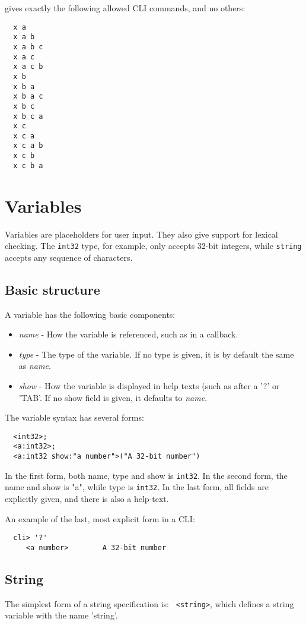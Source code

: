 \documentclass[a4paper, 10pt] {article}
\begin{document}
gives exactly the following allowed CLI commands, and no others:
\begin{verbatim}
  x a
  x a b
  x a b c
  x a c
  x a c b
  x b
  x b a
  x b a c
  x b c
  x b c a
  x c
  x c a
  x c a b
  x c b
  x c b a
\end{verbatim}

\section{Variables}
\label{sec:variables}
Variables are placeholders for user input. They also give support for
lexical checking. The {\tt int32} type, for example, only
accepts 32-bit integers, while {\tt string} accepts any sequence of
characters. 

\subsection{Basic structure}

A variable has the following basic components:
\begin{itemize}
\item {\em name} - How the variable is referenced, such as in a callback.
\item {\em type} - The type of the variable. If no type is given, it is by default the same as {\em name}.
\item {\em show} - How the variable is displayed in help texts (such as after a '?' or 'TAB'. If no show field is given,  it defaults to {\em name}.
\end{itemize}

The variable syntax has several forms:
\begin{verbatim}
  <int32>;                
  <a:int32>;              
  <a:int32 show:"a number">("A 32-bit number")
\end{verbatim}

In the first form, both name, type and show is {\tt int32}. In the
second form, the name and show is "a", while type is {\tt int32}. 
In the last form, all fields are explicitly given, and there is also a help-text.

An example of the last, most explicit form in a CLI:
\begin{verbatim}
  cli> '?'
     <a number>        A 32-bit number
\end{verbatim}

\subsection{String}
The simplest form of a string specification is: {\tt
<string>}, which defines a string variable with the name 'string'.
\end{document}
